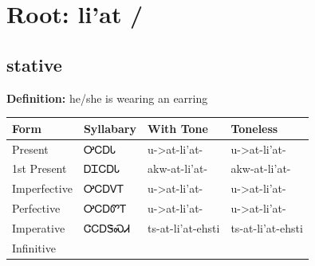 \documentclass{article}%
\begin{document}
%
\normalsize%
\section*{Root: li'at / }%
\subsection*{stative}%
\textbf{Definition: }%
he/she is wearing an earring%
\\[0.5em]%
\begin{tabular}{|l|l|l|l|}%
\hline%
\textbf{Form}&\textbf{Syllabary}&\textbf{With Tone}&\textbf{Toneless}\\%
\hline%
Present&ᎤᏟᎠᏓ&u{-}>at{-}li'at{-}&u{-}>at{-}li'at{-}\\%
1st Present&ᎠᏆᏟᎠᏓ&akw{-}at{-}li'at{-}&akw{-}at{-}li'at{-}\\%
Imperfective&ᎤᏟᎠᏙᎢ&u{-}>at{-}li'at{-}&u{-}>at{-}li'at{-}\\%
Perfective&ᎤᏟᎠᏛᎢ&u{-}>at{-}li'at{-}&u{-}>at{-}li'at{-}\\%
Imperative&ᏣᏟᎠᏕᏍᏗ&ts{-}at{-}li'at{-}ehsti&ts{-}at{-}li'at{-}ehsti\\%
Infinitive&&&\\%
\hline%
\end{tabular}%
\\[1em]%
\end{document}
